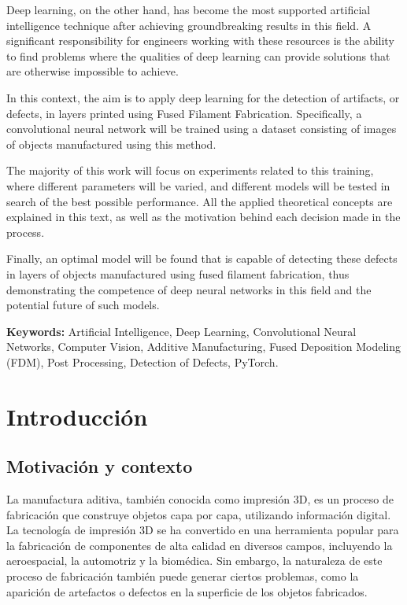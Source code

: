 \documentclass{report}
\begin{document}
Deep learning, on the other hand, has become the most supported artificial intelligence technique after achieving groundbreaking results in this field. A significant responsibility for engineers working with these resources is the ability to find problems where the qualities of deep learning can provide solutions that are otherwise impossible to achieve.

In this context, the aim is to apply deep learning for the detection of artifacts, or defects, in layers printed using Fused Filament Fabrication. Specifically, a convolutional neural network will be trained using a dataset consisting of images of objects manufactured using this method.

The majority of this work will focus on experiments related to this training, where different parameters will be varied, and different models will be tested in search of the best possible performance. All the applied theoretical concepts are explained in this text, as well as the motivation behind each decision made in the process.

Finally, an optimal model will be found that is capable of detecting these defects in layers of objects manufactured using fused filament fabrication, thus demonstrating the competence of deep neural networks in this field and the potential future of such models.


\textbf{Keywords:} Artificial Intelligence, Deep Learning, Convolutional Neural Networks, Computer Vision, Additive Manufacturing, Fused Deposition Modeling (FDM), Post Processing, Detection of Defects, PyTorch.




\tableofcontents
\listoffigures



















\chapter{Introducción}



\section{Motivación y contexto}
La manufactura aditiva, también conocida como impresión 3D, es un proceso de fabricación que construye objetos capa por capa, utilizando información digital. La tecnología de impresión 3D se ha convertido en una herramienta popular para la fabricación de componentes de alta calidad en diversos campos, incluyendo la aeroespacial, la automotriz y la biomédica. Sin embargo, la naturaleza de este proceso de fabricación también puede generar ciertos problemas, como la aparición de artefactos o defectos en la superficie de los objetos fabricados.
\end{document}
